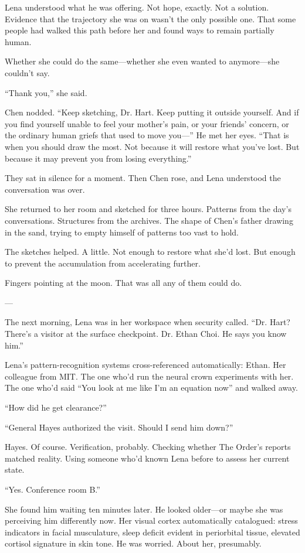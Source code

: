 Lena understood what he was offering. Not hope, exactly. Not a solution. Evidence that the trajectory she was on wasn't the only possible one. That some people had walked this path before her and found ways to remain partially human.

Whether she could do the same—whether she even wanted to anymore—she couldn't say.

``Thank you,'' she said.

Chen nodded. ``Keep sketching, Dr. Hart. Keep putting it outside yourself. And if you find yourself unable to feel your mother's pain, or your friends' concern, or the ordinary human griefs that used to move you—'' He met her eyes. ``That is when you should draw the most. Not because it will restore what you've lost. But because it may prevent you from losing everything.''

They sat in silence for a moment. Then Chen rose, and Lena understood the conversation was over.

She returned to her room and sketched for three hours. Patterns from the day's conversations. Structures from the archives. The shape of Chen's father drawing in the sand, trying to empty himself of patterns too vast to hold.

The sketches helped. A little. Not enough to restore what she'd lost. But enough to prevent the accumulation from accelerating further.

Fingers pointing at the moon. That was all any of them could do.

---

The next morning, Lena was in her workspace when security called. ``Dr. Hart? There's a visitor at the surface checkpoint. Dr. Ethan Choi. He says you know him.''

Lena's pattern-recognition systems cross-referenced automatically: Ethan. Her colleague from MIT. The one who'd run the neural crown experiments with her. The one who'd said ``You look at me like I'm an equation now'' and walked away.

``How did he get clearance?''

``General Hayes authorized the visit. Should I send him down?''

Hayes. Of course. Verification, probably. Checking whether The Order's reports matched reality. Using someone who'd known Lena before to assess her current state.

``Yes. Conference room B.''

She found him waiting ten minutes later. He looked older—or maybe she was perceiving him differently now. Her visual cortex automatically catalogued: stress indicators in facial musculature, sleep deficit evident in periorbital tissue, elevated cortisol signature in skin tone. He was worried. About her, presumably.

